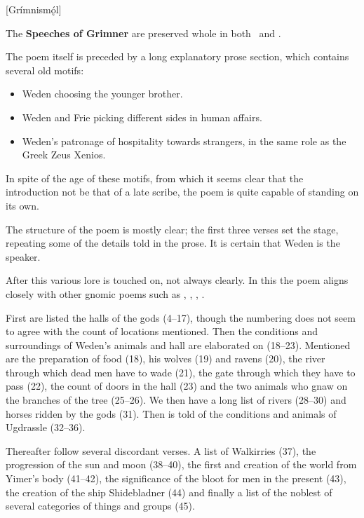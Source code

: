[Grímnismǫ́l]


The \textbf{Speeches of Grimner} are preserved whole in both \Regius\ and \AM.

The poem itself is preceded by a long explanatory prose section, which contains several old motifs:

\begin{itemize}
  \item Weden choosing the younger brother.
  \item Weden and Frie picking different sides in human affairs.
  \item Weden’s patronage of hospitality towards strangers, in the same role as the Greek Zeus Xenios.
\end{itemize}

In spite of the age of these motifs, from which it seems clear that the introduction not be that of a late scribe, the poem is quite capable of standing on its own.

The structure of the poem is mostly clear; the first three verses set the stage, repeating some of the details told in the prose. It is certain that Weden is the speaker.

After this various lore is touched on, not always clearly. In this the poem aligns closely with other gnomic poems such as \Havamal, \Vafthrudnismal, \Sigrdrifumal, \Allvismal.

First are listed the halls of the gods (4–17), though the numbering does not seem to agree with the count of locations mentioned. Then the conditions and surroundings of Weden’s animals and hall are elaborated on (18–23). Mentioned are the preparation of food (18), his wolves (19) and ravens (20), the river through which dead men have to wade (21), the gate through which they have to pass (22), the count of doors in the hall (23) and the two animals who gnaw on the branches of the tree (25–26). We then have a long list of rivers (28–30) and horses ridden by the gods (31). Then is told of the conditions and animals of Ugdrassle (32–36).

Thereafter follow several discordant verses. A list of Walkirries (37), the progression of the sun and moon (38–40), the first  and creation of the world from Yimer’s body (41–42), the significance of the bloot for men in the present (43), the creation of the ship Shidebladner (44) and finally a list of the noblest of several categories of things and groups (45).

